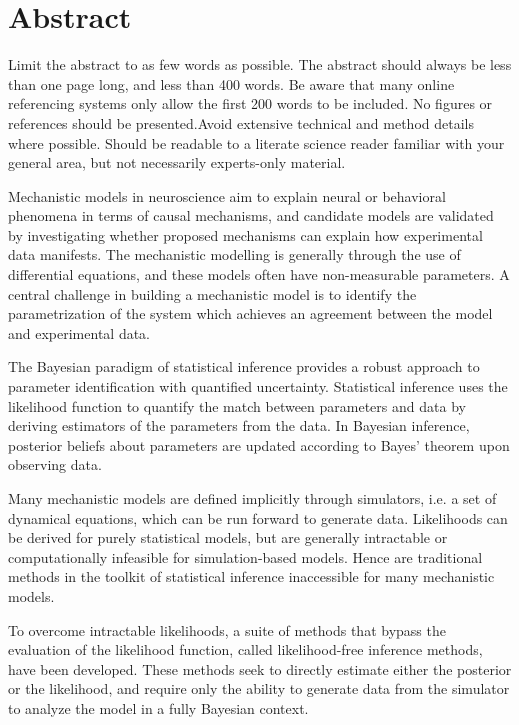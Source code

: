 \chapter*{Abstract}
\thispagestyle{plain}

Limit the abstract to as few words as possible. The abstract should always be less than one page long, and less than 400 words. Be aware that many online referencing systems only allow the first 200 words to be included. No figures or references should be presented.Avoid extensive technical and method details where possible. Should be readable to a literate science reader familiar with your general area, but not necessarily experts-only material.

Mechanistic models in neuroscience aim to explain neural or behavioral phenomena in terms of causal mechanisms, and candidate models are validated by investigating whether proposed mechanisms can explain how experimental data manifests. The mechanistic modelling is generally through the use of differential equations, and these models often have non-measurable parameters. A central challenge in building a mechanistic model is to identify the parametrization of the system which achieves an agreement between the model and experimental data.

The Bayesian paradigm of statistical inference provides a robust approach to parameter identification with quantified uncertainty. Statistical inference uses the likelihood function to quantify the match between parameters and data by deriving estimators of the parameters from the data. In Bayesian inference, posterior beliefs about parameters are updated according to Bayes' theorem upon observing data.

Many mechanistic models are defined implicitly through simulators, i.e. a set of dynamical equations, which can be run forward to generate data. Likelihoods can be derived for purely statistical models, but are generally intractable or computationally infeasible for simulation-based models. Hence are traditional methods in the toolkit of statistical inference inaccessible for many mechanistic models.

To overcome intractable likelihoods, a suite of methods that bypass the evaluation of the likelihood function, called likelihood-free inference methods, have been developed. These methods seek to directly estimate either the posterior or the likelihood, and require only the ability to generate data from the simulator to analyze the model in a fully Bayesian context.